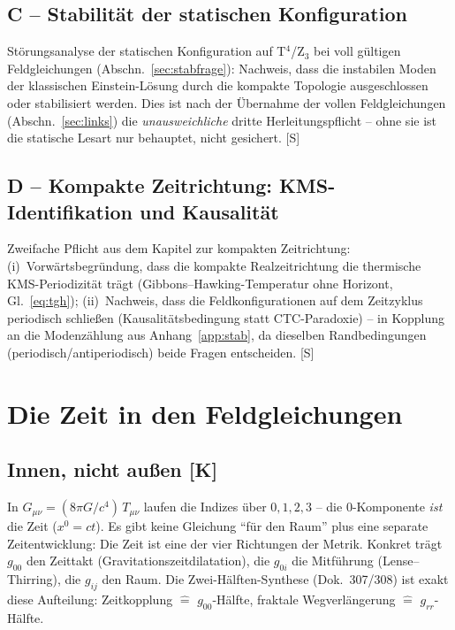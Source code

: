 \section{C -- Stabilität der statischen Konfiguration}

Störungsanalyse der statischen Konfiguration auf T$^4$/Z$_3$ bei
voll gültigen Feldgleichungen (Abschn.~\ref{sec:stabfrage}): Nachweis, dass die
instabilen Moden der klassischen Einstein-Lösung durch die kompakte
Topologie ausgeschlossen oder stabilisiert werden. Dies ist nach der
Übernahme der vollen Feldgleichungen (Abschn.~\ref{sec:links}) die
\emph{unausweichliche} dritte Herleitungspflicht -- ohne sie ist
die statische Lesart nur behauptet, nicht gesichert. [S]

\section{D -- Kompakte Zeitrichtung: KMS-Identifikation und
Kausalität}

Zweifache Pflicht aus dem Kapitel zur kompakten Zeitrichtung:
(i)~Vorwärtsbegründung, dass die kompakte Realzeitrichtung die
thermische KMS-Periodizität trägt (Gibbons--Hawking-Temperatur ohne
Horizont, Gl.~\eqref{eq:tgh}); (ii)~Nachweis, dass die
Feldkonfigurationen auf dem Zeitzyklus periodisch schließen
(Kausalitätsbedingung statt CTC-Paradoxie) -- in Kopplung an die
Modenzählung aus Anhang~\ref{app:stab}, da dieselben Randbedingungen
(periodisch/antiperiodisch) beide Fragen entscheiden. [S]

\chapter{Die Zeit in den Feldgleichungen}

\section{Innen, nicht außen [K]}

In $G_{\mu\nu} = (8\pi G/c^4)\,T_{\mu\nu}$ laufen die Indizes über
$0,1,2,3$ -- die $0$-Komponente \emph{ist} die Zeit ($x^0 = ct$).
Es gibt keine Gleichung \enquote{für den Raum} plus eine separate
Zeitentwicklung: Die Zeit ist eine der vier Richtungen der Metrik.
Konkret trägt $g_{00}$ den Zeittakt (Gravitationszeitdilatation),
die $g_{0i}$ die Mitführung (Lense--Thirring), die $g_{ij}$ den
Raum. Die Zwei-Hälften-Synthese (Dok.~307/308) ist exakt diese
Aufteilung: Zeitkopplung $\hat{=}$ $g_{00}$-Hälfte, fraktale
Wegverlängerung $\hat{=}$ $g_{rr}$-Hälfte.

